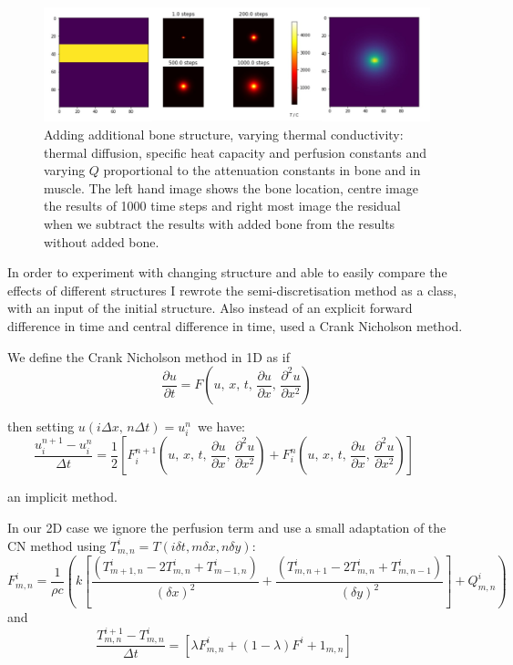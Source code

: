 \documentclass[11pt]{article} %
\begin{document}
 \begin{figure}
 	\centering
 	\includegraphics[width=\linewidth]{"Report_images/bone with changing Q"}
 	\caption{Adding additional bone structure, varying thermal conductivity: thermal diffusion, specific heat capacity and perfusion constants and varying $ Q $ proportional to the attenuation constants in bone and in muscle. The left hand image shows the bone location, centre image the results of 1000 time steps and right most image the residual when we subtract the results with added bone from the results without added bone. }
 	\label{fig:bone-with-changing-q}
 \end{figure}
 


In order to experiment with changing structure and able to easily compare the effects of different structures I rewrote the semi-discretisation method as a class, with an input of the initial structure. Also instead of an explicit forward difference in time and central difference in time, used a Crank Nicholson method. 

We define the Crank Nicholson method in 1D as if $$ \frac{\partial u}{\partial t} = F\left(u,\, x,\, t,\, \frac{\partial u}{\partial x},\, \frac{\partial^2 u}{\partial x^2}\right)$$

then setting $u(i \Delta x,\, n \Delta t) = u_{i}^{n}\,$ we have: $$ \frac{u_{i}^{n + 1} - u_{i}^{n}}{\Delta t} = 
\frac{1}{2}\left[
F_{i}^{n + 1}\left(u,\, x,\, t,\, \frac{\partial u}{\partial x},\, \frac{\partial^2 u}{\partial x^2}\right) + 
F_{i}^{n}\left(u,\, x,\, t,\, \frac{\partial u}{\partial x},\, \frac{\partial^2 u}{\partial x^2}\right)
\right] \qquad $$

an implicit method. 

In our 2D case we ignore the perfusion term and use a small adaptation of the CN method using $T^i_{m,n}= T(i\delta t, m\delta x, n\delta y)$: $$F^i_{m,n} = \frac{1}{\rho c} \left( k\left[  \frac{(T^i_{m+1,n}-2T^i_{m,n}+T^i_{m-1,n})}{(\delta x)^2}+\frac{(T^i_{m,n+1}-2T^i_{m,n}+T^i_{m,n-1})}{(\delta y)^2}\right] +Q^i_{m,n}\right) $$
and \begin{equation}
\frac{T_{m,n}^{i + 1} - T_{m,n}^{i}}{\Delta t} = 
\left[
\lambda F^{i}_{m,n}+(1-\lambda)F^{i}+1_{m,n} 
\right] \qquad \label{method}
\end{equation} 
\end{document}
